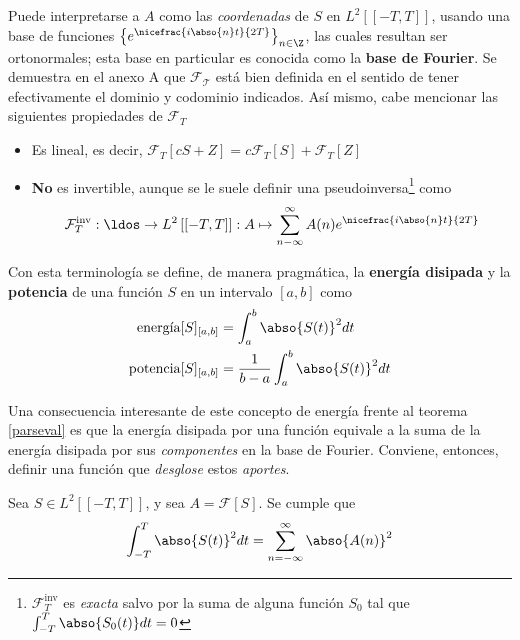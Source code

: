 Puede interpretarse a $A$ como las \textit{coordenadas} de $S$ en $L^{2}\left[[-T,T]\right]$, 
usando una base de funciones $\left\{ e^{\nicefrac{i \abso{n} t}{2 T}} \right\}_{n\in \Z}$, las
cuales resultan ser ortonormales; esta base en particular es conocida como la \textbf{base de 
Fourier}.
Se demuestra en el anexo A que $\mathcal{F_T}$ está bien definida en el sentido de 
tener efectivamente el dominio y codominio indicados. Así mismo, cabe mencionar las siguientes 
propiedades de $\mathcal{F}_T$
\begin{itemize}
\item Es lineal, es decir, $\mathcal{F}_T[cS + Z] = c\mathcal{F}_T[S] + \mathcal{F}_T[Z]$

\item \textbf{No} es invertible, aunque se le suele definir una
pseudoinversa\footnote{$\mathcal{F}_T^{\text{inv}}$ es \textit{exacta} salvo por la suma
de alguna función $S_0$ tal que $\int_{-T}^{T}\abso{S_0(t)}dt = 0$} como
\begin{equation*}
\mathcal{F}_{T}^{\text{inv}} : \ldos \rightarrow L^{2}\left[[-T,T]\right] :
A \mapsto \sum_{n -\infty}^{\infty} A(n) e^{\nicefrac{i \abso{n} t}{2 T}}
\end{equation*}
\end{itemize}

Con esta terminología se define, de manera pragmática, la \textbf{energía disipada} y la 
\textbf{potencia} de una función $S$ en un intervalo $[a,b]$ como 
\begin{align*}
\text{energía}[S]_{[a,b]} &= \int_a^{b} \abso{S(t)}^{2} dt \\
\text{potencia}[S]_{[a,b]} &= \frac{1}{b-a} \int_a^{b} \abso{S(t)}^{2} dt
\end{align*}
%

Una consecuencia interesante de este concepto de energía frente al teorema \ref{parseval} es que la 
energía disipada por una función equivale a la suma de la energía disipada por sus 
\textit{componentes} en la base de Fourier.
Conviene, entonces, definir una función que \textit{desglose} estos \textit{aportes}.

\begin{teorema}[Parseval]
Sea $S \in L^{2}\left[[-T,T]\right]$, y sea $A = \mathcal{F}[S]$. Se cumple que
\begin{equation*}
\int_{-T}^{T} \abso{S(t)}^{2} dt = \sum_{n=-\infty}^{\infty} \abso{A(n)}^{2}
\end{equation*}
\label{parseval}
\end{teorema}

